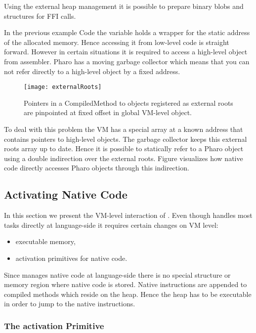 Using the external heap management it is possible to prepare binary blobs and structures for FFI calls.

In the previous example Code  the  variable holds a wrapper for the static address of the allocated memory.
Hence accessing it from low-level code is straight forward.
However in certain situations it is required to access a high-level object from assembler.
Pharo has a moving garbage collector which means that you can not refer directly to a high-level object by a fixed address.

\begin{figure}[h]
	\centering
	\texttt{[image: externalRoots]}
	\caption{Pointers in a CompiledMethod to objects registered as external roots are pinpointed at fixed offset in global VM-level object.
	}
\end{figure}

To deal with this problem the VM has a special array at a known address that contains pointers to high-level objects.
The garbage collector keeps this external roots array up to date.
Hence it is possible to statically refer to a Pharo object using a double indirection over the external roots.
Figure  visualizes how native code directly accesses Pharo objects through this indirection.


\subsection{Activating Native Code}

In this section we present the VM-level interaction of \NB.
Even though \NB handles most tasks directly at language-side it requires certain changes on VM level:
\begin{itemize}
	\item executable memory,
	\item activation primitives for native code.
\end{itemize}
%
Since \NB manages native code at language-side there is no special structure or memory region where native code is stored.
Native instructions are appended to compiled methods which reside on the heap.
Hence the heap has to be executable in order to jump to the native instructions.


\subsubsection{The \NB activation Primitive}

